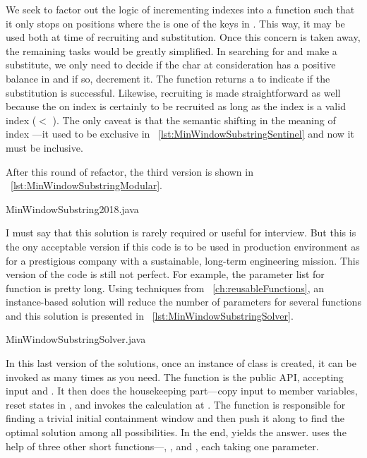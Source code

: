 We seek to factor out the
logic of incrementing indexes into a function such that it only stops on positions where the
is one of the keys in .
This way, it may be used both at time of  recruiting and  substitution.
Once this concern is taken away, the remaining tasks would be greatly simplified.
In searching for and make a  substitute, we only need to decide if the char at
consideration has a positive balance in  and if so, decrement it.
The function returns a  to indicate if the substitution is successful.
Likewise, recruiting is made straightforward as well because the  on index
 is certainly to be recruited as long as the index is a valid index ($<$ ).
The only caveat is that the semantic shifting in the meaning of index ---it used to
be exclusive in ~\autoref{lst:MinWindowSubstringSentinel} and now it must be inclusive.

After this round of refactor, the third version is shown in
~\autoref{lst:MinWindowSubstringModular}.


{MinWindowSubstring2018.java}

I must say that this solution is rarely required or useful for interview.
But this is the ony acceptable version if this code is to be used in production
environment as for a prestigious company with a sustainable, long-term engineering mission.
This version of the code is still not perfect.
For example, the parameter list for function  is pretty long.
Using techniques from ~\autoref{ch:reusableFunctions},
an instance-based solution will reduce the number of parameters for several functions and this
solution is presented in ~\autoref{lst:MinWindowSubstringSolver}.


{MinWindowSubstringSolver.java}

In this last version of the solutions, once an instance of class 
is created, it can be invoked as many times as you need.
The function  is the public API, accepting input  and .
It then does the housekeeping part---copy input to member variables, reset states in
, and invokes the calculation at .
The  function is responsible for finding a trivial initial containment window and
then push it along to find the optimal solution among all possibilities.
In the end,  yields the answer.
 uses the help of three other short functions---, , and
, each taking one parameter.

